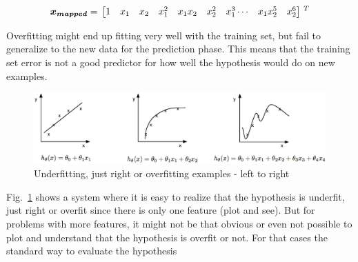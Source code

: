 \begin{equation}{\label{eqn:featureMapping2}}
\bm{x_{mapped}}
=\,
\begin{bmatrix}
1 & x_1 & x_2 & x_1^2 & x_1x_2 & x_2^2 & x_1^3 \cdots & x_1x_2^5 & x_2^6 
\end{bmatrix}
\,^ T
\end{equation} 

Overfitting might end up fitting very well with the training set, but fail to generalize to the new data for the prediction phase. 
This means that the training set error is not a good predictor for how well the hypothesis would do on new examples.

\begin{figure}
\begin{center}
\includegraphics[width=16cm]{figures/underOverFit}    %
\caption{Underfitting, just right or overfitting examples - left to right} 
\label{fig:underOverFit}
\end{center}
\end{figure}

Fig.~\ref{fig:underOverFit} shows a system where it is easy to realize that the hypothesis is underfit, just right or overfit since there is only one feature (plot and see). 
But for problems with more features, it might not be that obvious or even not possible to plot and understand that the hypothesis is overfit or not. For that cases the standard way to evaluate the hypothesis
 
